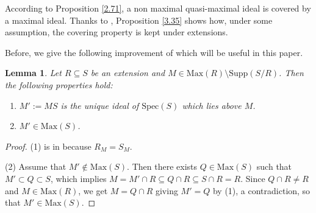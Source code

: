 \documentclass[12pt,leqno]{amsart}
\newtheorem{lemma}[theorem]{Lemma}
\theoremstyle{definition}
\begin{document}
According to Proposition \ref{2.71}, a non maximal quasi-maximal ideal is covered by a maximal ideal. Thanks to \cite[Corollary 1, p. 237]{ZS}, Proposition \ref{3.35} shows how, under some assumption, the covering property is kept under extensions.

 Before, we give the following improvement of \cite[Lemma 2.4]{DPP2} which will be useful in this paper.

\begin{lemma}\label{3.46}Let $R\subseteq S$ be an extension and $M\in\mathrm{Max}(R)\setminus\mathrm{Supp}(S/R)$. Then the following properties hold:
\begin{enumerate}
\item$M':=MS$ is the unique ideal of $\mathrm{Spec}(S)$ which lies above $M$. 
\item $M'\in\mathrm{Max}(S)$. 
\end{enumerate}
\end{lemma}

\begin{proof} (1) is in \cite[Lemma 2.4]{DPP2} because $R_M=S_M$.

(2) Assume that $M'\not\in\mathrm{Max}(S)$. Then there exists $Q\in\mathrm{Max}(S)$ such that $M'\subset Q\subset S$, which implies $M=M' \cap R\subseteq Q\cap R\subseteq S\cap R=R$. Since $Q\cap R\neq R$ and $M\in\mathrm{Max}(R)$, we get $M=Q\cap R$ giving $M'=Q$ by (1), a contradiction, so that $M'\in\mathrm{Max}(S)$.
\end{proof}
\end{document}
